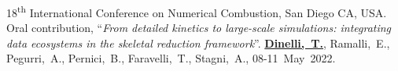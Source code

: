 \begin{etaremune}
   \item
      18\textsuperscript{th} International Conference on Numerical Combustion, San Diego
      CA, USA. Oral contribution, ``\textit{From detailed kinetics to large-scale
      simulations: integrating data ecosystems in the skeletal reduction framework}''.
      \textbf{\underline{Dinelli,~T.}}, Ramalli,~E., Pegurri,~A., Pernici,~B.,
      Faravelli,~T., Stagni,~A.,
      08-11~May~2022.
\end{etaremune}
